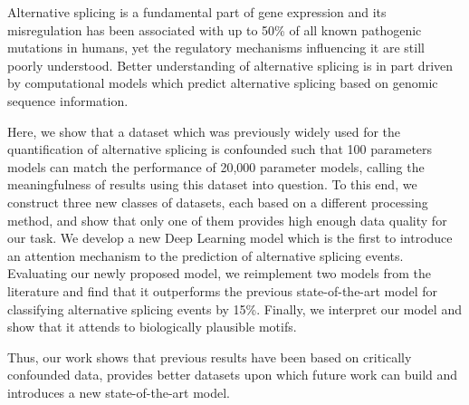 
Alternative splicing is a fundamental part of gene expression and its misregulation has been associated with up to 50\% of all known pathogenic mutations in humans, yet the regulatory mechanisms influencing it are still poorly understood. Better understanding of alternative splicing is in part driven by computational models which predict alternative splicing based on genomic sequence information. 

Here, we show that a dataset which was previously widely used for the quantification of alternative splicing is confounded such that 100 parameters models can match the performance of 20,000 parameter models, calling the meaningfulness of results using this dataset into question. To this end, we construct three new classes of datasets, each based on a different processing method, and show that only one of them provides high enough data quality for our task. We develop a new Deep Learning model which is the first to introduce an attention mechanism to the prediction of alternative splicing events. Evaluating our newly proposed model, we reimplement two models from the literature and find that it outperforms the previous state-of-the-art model for classifying alternative splicing events by 15\%. Finally, we interpret our model and show that it attends to biologically plausible motifs. 

Thus, our work shows that previous results have been based on critically confounded data,
provides better datasets upon which future work can build and introduces a new state-of-the-art model. 

